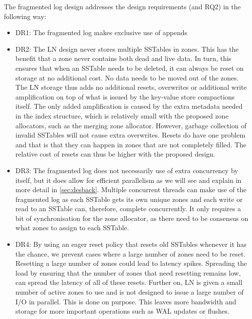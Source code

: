 The fragmented log design addresses the design requirements (and RQ2) in the following way:
\begin{itemize}
    \item DR1: The fragmented log makes exclusive use of appends
    \item DR2: The LN design never stores multiple SSTables in zones. This has the benefit that a zone never contains both dead and live data. In turn, this ensures that when an SSTable needs to be deleted, it can always be reset on storage at no additional cost. No data needs to be moved out of the zones. The LN storage thus adds no additional resets, overwrites or additional write amplification on top of what is issued by the key-value store compactions itself. The only added amplification is caused by the extra metadata needed in the index structure, which is relatively small with the proposed zone allocators, such as the merging zone allocator. However, garbage collection of invalid SSTables will not cause extra overwrites. Resets do have one problem and that is that they can happen in zones that are not completely filled. The relative cost of resets can thus be higher with the proposed design.
    \item DR3: The fragmented log does not necessarily use of extra concurrency by itself, but it does allow for efficient parallelism as we will see and explain in more detail in \autoref{sec:desback}. Multiple concurrent threads can make use of the fragmented log as each SSTable gets its own unique zones and each write or read to an SSTable can, therefore, complete concurrently. It only requires a bit of synchronisation for the zone allocator, as there need to be consensus on what zones to assign to each SSTable. 
    \item DR4: By using an eager reset policy that resets old SSTables whenever it has the chance, we prevent cases where a large number of zones need to be reset. Resetting a large number of zones could lead to latency spikes. Spreading the load by ensuring that the number of zones that need resetting remains low, can spread the latency of all of these resets. Further on, LN is given a small number of active zones to use and is not designed to issue a large number of I/O in parallel. This is done on purpose. This leaves more bandwidth and storage for more important operations such as WAL updates or flushes. 
\end{itemize}

